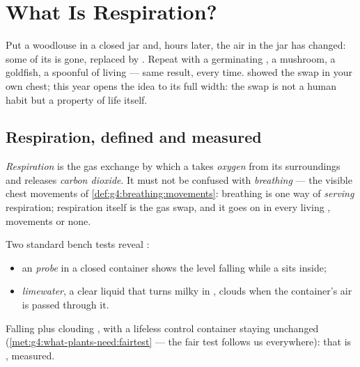 \chapter{What Is Respiration?}\label{ch:g7:what-is-respiration}

Put a woodlouse in a closed jar and, hours later, the air in
the jar has changed: some of its  is gone, replaced by
. Repeat with a germinating , a mushroom, a
goldfish, a spoonful of living  --- same result, every
time.  showed the swap in
your own chest; this year opens the idea to its full width:
the swap is not a human habit but a property of life itself.

\section{Respiration, defined and measured}

\begin{definition}[Respiration]\label{def:g7:what-is-respiration:respiration}
\emph{Respiration} is the gas exchange by
which a  takes \emph{oxygen} from
its surroundings and releases \emph{carbon
dioxide}. It must not be confused with
\emph{breathing} --- the visible chest
movements of \cref{def:g4:breathing:movements}: breathing is
one way of \emph{serving} respiration; respiration itself is
the gas swap, and it goes on in every living , movements
or none.
\end{definition}

\begin{proposition}\label{prop:g7:what-is-respiration:shown}
Two standard bench tests reveal :
\begin{itemize}
  \item an \emph{ probe} in a closed container shows
        the  level falling while a  sits
        inside;
  \item \emph{limewater}, a clear liquid
        that turns milky in , clouds when the
        container's air is passed through it.
\end{itemize}
Falling  plus clouding , with a lifeless
control container staying unchanged
(\cref{met:g4:what-plants-need:fairtest} --- the fair test
follows us everywhere): that is , measured.
\end{proposition}
\admitted

